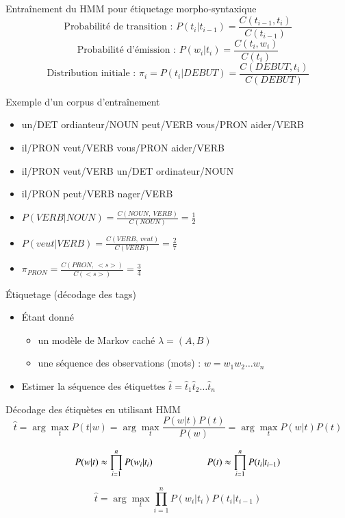 \documentclass{KodeBook}
\begin{document}
\begin{block}{Entraînement du HMM pour étiquetage morpho-syntaxique}
	\[
	\text{Probabilité de transition : } P(t_i | t_{i-1}) = \frac{C(t_{i-1}, t_i)}{C(t_{i-1})} 
	\]\[
	\text{Probabilité d'émission : } P(w_i | t_i) = \frac{C(t_i, w_i)}{C(t_i)}
	\]\[
	\text{Distribution initiale : } \pi_i = P(t_i | DEBUT) = \frac{C(DEBUT, t_i)}{C(DEBUT)}
	\]
	
\end{block}

\begin{exampleblock}{Exemple d'un corpus d'entraînement}
	\begin{itemize}
		\item un/DET ordianteur/NOUN peut/VERB vous/PRON aider/VERB
		\item il/PRON veut/VERB vous/PRON aider/VERB
		\item il/PRON veut/VERB un/DET ordinateur/NOUN
		\item il/PRON peut/VERB nager/VERB
	\end{itemize}
\end{exampleblock}

\begin{itemize}
	\item $P(VERB | NOUN) = \frac{C(NOUN,\ VERB)}{C(NOUN)} = \frac{1}{2}$
	\item $P(veut | VERB) = \frac{C(VERB,\ veut)}{C(VERB)} = \frac{2}{7}$
	\item $\pi_{PRON} = \frac{C(PRON,\ <s>)}{C(<s>)} = \frac{3}{4} $
\end{itemize}

Étiquetage (décodage des tags)

\begin{itemize}
	\item Étant donné 
	\begin{itemize}
		\item un modèle de Markov caché $\lambda = (A, B)$
		\item une séquence des observations (mots) : $w = w_1 w_2 \ldots w_n$
	\end{itemize}
	\item Estimer la séquence des étiquettes $\hat{t} = \hat{t}_1 \hat{t}_2 \ldots \hat{t}_n$
\end{itemize}

\begin{block}{Décodage des étiquètes en utilisant HMM}
	\[
	\hat{t} = \arg\max\limits_t P(t | w) = \arg\max\limits_t \frac{P(w|t) P(t)}{P(w)} = \arg\max\limits_t P(w|t) P(t)%
	\]
	
	\[ 
	P(w | t) \approx \prod\limits_{i=1}^n P(w_i|t_i) 
	\hskip2cm
	P(t) \approx \prod\limits_{i=1}^n P(t_i|t_{i-1}) 
	\]
	
	\[
	\hat{t} = \arg\max\limits_t \prod\limits_{i=1}^n P(w_i|t_i) P(t_i|t_{i-1})
	\]
\end{block}
\end{document}
